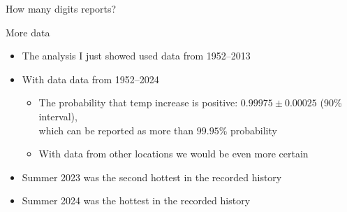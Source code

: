 \documentclass[english,t]{beamer}
\begin{document}
\begin{frame}{How many digits reports?}
  
\end{frame}

\begin{frame}{More data}

  \vspace{-0.75\baselineskip}
  \begin{itemize}
  \item<1-> The analysis I just showed used data from 1952--2013
  \item<2-> With data data from 1952--2024
    \begin{itemize}
    \item The probability that temp increase is positive:
      $0.99975 \pm 0.00025$ (90\% interval),\\ which can be reported as more than
      $99.95\%$ probability
    \item With data from other locations we would be even more certain
    \end{itemize}
  \item<3-> Summer 2023 was the second hottest in the recorded history
  \item<3-> Summer 2024 was the hottest in the recorded history
  \end{itemize}
  \vspace{-0.5\baselineskip}
  
\end{frame}
\end{document}

